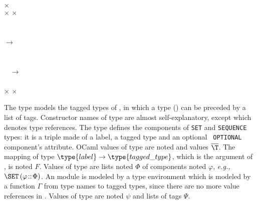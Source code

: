 \smallskip

\Xtype {} \equal {}  $\times$
\\
\Xand {} \equal \lpar{} $\times$
\rpar{} $\times$ \\
\Xand {} \equal \Universal{} \vbar~\Private{}
\vbar~\Application{} \vbar~\Context\\ 
\Xand {} \equal \Explicit \vbar~\Implicit\\
\Xand {} \equal \lbra\Choice{} \Xof
{} $\rightarrow$  
\vbar~\OctetString{}\\
\vbar~\SET{} \Xof {} 
\vbar~\SEQUENCE{} \Xof {} 
\vbar~\BitString{}\\
\vbar~\SETOF{} \Xof {} 
\vbar~\SEQUENCEOF{} \Xof {}
\vbar \Null{}\\
\vbar~\Enumerated{} \Xof {} $\rightarrow$ 
\vbar~\Integer{} 
\vbar~\Boolean{} 
\vbar~\REAL{}\\
\vbar \pvString{} 
\vbar~\TRef{} \Xof {}\rbra\\ 
\Xand {} \equal \lpar{} $\times$
 $\times$ \lbra\Optional\rbra{}
\rpar{} 

\smallskip

The type  models the tagged types of \core, in
which a type () can be preceded by a list of
tags. Constructor names of type  are almost
self-explanatory, except \TRef{} which denotes type references. The
type  defines the components of
\texttt{\small SET} and \texttt{\small SEQUENCE} \core types: it is a
triple made of a label, a tagged type and an optional \texttt{\small
OPTIONAL} component's attribute. OCaml values of type
 are noted \T{} and  values
$\overline{\T}$. The mapping of type $\type{label} \rightarrow
\type{tagged\_type}$, which is the argument of \Choice, is noted
$F$. Values of type  are lists noted $\Phi$ of
components noted $\varphi$, \emph{e.g.,} $\SET \, (\varphi\!::\!\Phi)$. An
\ASN module is modeled by a type environment which is modeled by a
function $\Gamma$ from type names to tagged types, since there are no
more value references in \core. Values of type  are noted
$\psi$ and lists of tags $\Psi$.

